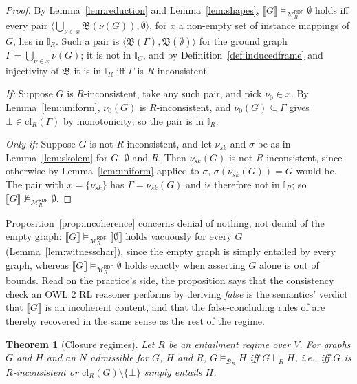 \documentclass[12pt]{article}
\newcommand{\I}{\mathbb{I}}
\newtheorem{theorem}{Theorem}
\theoremstyle{definition}
\newcommand{\tuple}[1]{\langle #1 \rangle}
\newcommand{\sem}[1]{\llbracket #1 \rrbracket}  %
\newcommand{\bmap}{\mathfrak{B}}  %
\newcommand{\Mcal}{\mathcal{M}}   %
\newcommand{\Bcal}{\mathcal{B}}   %
\newcommand{\cl}{\mathrm{cl}}   %
\begin{document}
\begin{proof}
By Lemma~\ref{lem:reduction} and Lemma~\ref{lem:shapes}, $\sem{G} \models_{\Mcal_{R}^{\mathsf{RDF}}} \emptyset$ holds iff every pair $\tuple{\bigcup_{\nu \in x}\bmap(\nu(G)), \emptyset}$, for $x$ a non-empty set of instance mappings of $G$, lies in $\I_R$. Such a pair is $\tuple{\bmap(\Gamma), \bmap(\emptyset)}$ for the ground graph $\Gamma = \bigcup_{\nu \in x}\nu(G)$; it is not in $\I_C$, and by Definition~\ref{def:inducedframe} and injectivity of $\bmap$ it is in $\I_R$ iff $\Gamma$ is $R$-inconsistent.

\textit{If:} Suppose $G$ is $R$-inconsistent, take any such pair, and pick $\nu_0 \in x$. By Lemma~\ref{lem:uniform}, $\nu_0(G)$ is $R$-inconsistent, and $\nu_0(G) \subseteq \Gamma$ gives $\bot \in \cl_R(\Gamma)$ by monotonicity; so the pair is in $\I_R$.

\textit{Only if:} Suppose $G$ is not $R$-inconsistent, and let $\nu_{sk}$ and $\sigma$ be as in Lemma~\ref{lem:skolem} for $G$, $\emptyset$ and $R$. Then $\nu_{sk}(G)$ is not $R$-inconsistent, since otherwise by Lemma~\ref{lem:uniform} applied to $\sigma$, $\sigma(\nu_{sk}(G)) = G$ would be. The pair with $x = \{\nu_{sk}\}$ has $\Gamma = \nu_{sk}(G)$ and is therefore not in $\I_R$; so $\sem{G} \not\models_{\Mcal_{R}^{\mathsf{RDF}}} \emptyset$.
\end{proof}

Proposition~\ref{prop:incoherence} concerns denial of nothing, not denial of the empty graph: $\sem{G} \models_{\Mcal_{R}^{\mathsf{RDF}}} \sem{\emptyset}$ holds vacuously for every $G$ (Lemma~\ref{lem:witnesschar}), since the empty graph is simply entailed by every graph, whereas $\sem{G} \models_{\Mcal_{R}^{\mathsf{RDF}}} \emptyset$ holds exactly when asserting $G$ alone is out of bounds. Read on the practice's side, the proposition says that the consistency check an OWL 2 RL reasoner performs by deriving \emph{false} is the semantics' verdict that $\sem{G}$ is an incoherent content, and that the false-concluding rules of \citet{motik2012owl} are thereby recovered in the same sense as the rest of the regime.

\begin{theorem}[Closure regimes]
\label{thm:closure}
Let $R$ be an entailment regime over $V$. For graphs $G$ and $H$ and an $N$ admissible for $G$, $H$ and $R$, $G \models_{\Bcal_{R}} H$ iff $G \vdash_R H$, i.e., iff $G$ is $R$-inconsistent or $\cl_R(G) \setminus \{\bot\}$ simply entails $H$.
\end{theorem}
\end{document}
